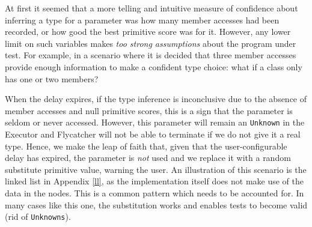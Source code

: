 At first it seemed that a more telling and intuitive measure of confidence about inferring a type for a parameter was how many member accesses had been recorded, or how good the best primitive score was for it. However, any lower limit on such variables makes \emph{too strong assumptions} about the program under test. For example, in a scenario where it is decided that three member accesses provide enough information to make a confident type choice: what if a class only has one or two members?


When the delay expires, if the type inference is inconclusive due to the absence of member accesses and null primitive scores, this is a sign that the parameter is seldom or never accessed. However, this parameter will remain an \texttt{Unknown} in the \textsf{Executor} and \textsf{Flycatcher} will not be able to terminate if we do not give it a real type. Hence, we make the leap of faith that, given that the user-configurable delay has expired, the parameter is \emph{not} used and we replace it with a random substitute primitive value, warning the user. An illustration of this scenario is the linked list in Appendix \ref{ll}, as the implementation itself does not make use of the data in the nodes. This is a common pattern which needs to be accounted for. In many cases like this one, the substitution works and enables tests to become valid (rid of \texttt{Unknowns}).



